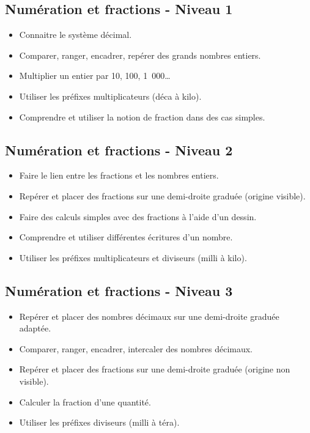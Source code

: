 \documentclass[a4paper,12pt,fleqn]{article}
\begin{document}
\renewcommand{\labelitemi}{}

\subsection*{Numération et fractions - Niveau 1}

\begin{itemize}
	\item {}Connaitre le système décimal.
	\item {}Comparer, ranger, encadrer, repérer des grands nombres entiers.
	\item {}Multiplier un entier par 10, 100, 1~000\ldots
	\item {}Utiliser les préfixes multiplicateurs (déca à kilo).
	\item {}Comprendre et utiliser la notion de fraction dans des cas simples.

\end{itemize}

\subsection*{Numération et fractions - Niveau 2}

\begin{itemize}
	\item {}Faire le lien entre les fractions et les nombres entiers.
	\item {}Repérer et placer des fractions sur une demi-droite graduée (origine visible).
	\item {}Faire des calculs simples avec des fractions à l’aide d’un dessin.
	\item {}Comprendre et utiliser différentes écritures d’un nombre.
	\item {}Utiliser les préfixes multiplicateurs et diviseurs (milli à kilo).
\end{itemize}

\subsection*{Numération et fractions - Niveau 3}

\begin{itemize}
	\item {}Repérer et placer des nombres décimaux sur une demi-droite graduée adaptée.
	\item {}Comparer, ranger, encadrer, intercaler des nombres décimaux.
	\item {}Repérer et placer des fractions sur une demi-droite graduée (origine non visible).
	\item {}Calculer la fraction d’une quantité.
	\item {}Utiliser les préfixes diviseurs (milli à téra).
\end{itemize}
\end{document}
